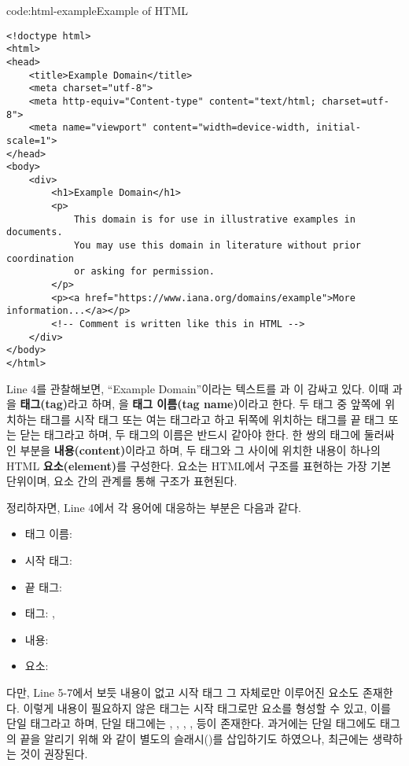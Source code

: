 \begin{code}{code:html-example}{Example of HTML}
\begin{verbatim}
<!doctype html>
<html>
<head>
    <title>Example Domain</title>
    <meta charset="utf-8">
    <meta http-equiv="Content-type" content="text/html; charset=utf-8">
    <meta name="viewport" content="width=device-width, initial-scale=1">
</head>
<body>
    <div>
        <h1>Example Domain</h1>
        <p>
            This domain is for use in illustrative examples in documents.
            You may use this domain in literature without prior coordination
            or asking for permission.
        </p>
        <p><a href="https://www.iana.org/domains/example">More information...</a></p>
        <!-- Comment is written like this in HTML -->
    </div>
</body>
</html>
\end{verbatim}
\end{code}

Line 4를 관찰해보면, ``Example Domain''이라는 텍스트를 과 이 감싸고 있다. 이때 과 을 \textbf{태그(tag)}라고 하며, 을 \textbf{태그 이름(tag name)}이라고 한다. 두 태그 중 앞쪽에 위치하는 태그를 시작 태그 또는 여는 태그라고 하고 뒤쪽에 위치하는 태그를 끝 태그 또는 닫는 태그라고 하며, 두 태그의 이름은 반드시 같아야 한다. 한 쌍의 태그에 둘러싸인 부분을 \textbf{내용(content)}이라고 하며, 두 태그와 그 사이에 위치한 내용이 하나의 HTML \textbf{요소(element)}를 구성한다. 요소는 HTML에서 구조를 표현하는 가장 기본 단위이며, 요소 간의 관계를 통해 구조가 표현된다.

정리하자면, Line 4에서 각 용어에 대응하는 부분은 다음과 같다.

\begin{itemize}
    \item 태그 이름: 
    \item 시작 태그: 
    \item 끝 태그: 
    \item 태그: , 
    \item 내용: 
    \item 요소: 
\end{itemize}

다만, Line 5-7에서 보듯 내용이 없고 시작 태그 그 자체로만 이루어진 요소도 존재한다. 이렇게 내용이 필요하지 않은 태그는 시작 태그로만 요소를 형성할 수 있고, 이를 단일 태그라고 하며, 단일 태그에는 , , , ,  등이 존재한다. 과거에는 단일 태그에도 태그의 끝을 알리기 위해 와 같이 별도의 슬래시(\cd{/})를 삽입하기도 하였으나, 최근에는 생략하는 것이 권장된다.

